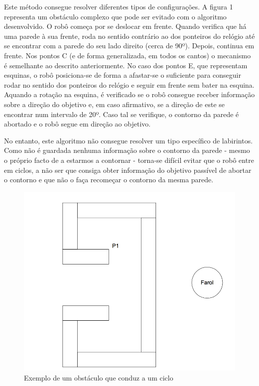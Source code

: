 \documentclass[citeauthoryear]{llncs} %
\begin{document}
Este método consegue resolver diferentes tipos de configurações. A figura 1 representa um obstáculo complexo que pode ser evitado com o algoritmo desenvolvido. O robô começa por se deslocar em frente. Quando verifica que há uma parede à sua frente, roda no sentido contrário ao dos ponteiros do relógio até se encontrar com a parede do seu lado direito (cerca de 90º). Depois, continua em frente. Nos pontos C (e de forma generalizada, em todos os cantos) o mecanismo é  semelhante ao descrito anteriormente. No caso dos pontos E, que representam esquinas, o robô posiciona-se de forma a afastar-se o suficiente para conseguir rodar no sentido dos ponteiros do relógio e seguir em frente sem bater na esquina. Aquando a rotação na esquina, é verificado se o robô consegue receber informação sobre a direção do objetivo e, em caso afirmativo, se a direção de este se encontrar num intervalo de 20º. Caso tal se verifique, o contorno da parede é abortado e o robô segue em direção ao objetivo.

No entanto, este algoritmo não consegue resolver um tipo específico de labirintos. Como não é guardada nenhuma informação sobre o contorno da parede - mesmo o próprio facto de a estarmos a contornar - torna-se difícil evitar que o robô entre em ciclos, a não ser que consiga obter informação do objetivo passível de abortar o contorno e que não o faça recomeçar o contorno da mesma parede.  

\begin{figure}[]
\begin{center}
\includegraphics[scale=0.20]{fig2.png}
\caption{Exemplo de um obstáculo que conduz a um ciclo}
\vspace{-20pt}
\end{center}
\end{figure}
\end{document}
